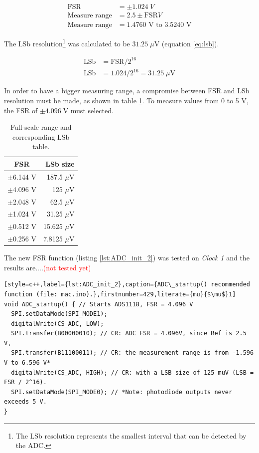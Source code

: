 \documentclass[a4paper,12pt]{article}
\begin{document}
\begin{align}
\text{FSR} &= \pm 1.024\; V\nonumber\\
\text{Measure range}&=2.5 \pm \text{FSR} V\nonumber\\
\text{Measure range}&= 1.4760 \text{ V to } 3.5240 \text{ V}
\label{eq:full_range_1}
\end{align}

The LSb resolution\footnote{The LSb resolution represents the smallest interval that can be detected by the ADC.} was calculated to be $31.25 \;\mu \mathrm{V}$ (equation \ref{eq:lsb}).

\begin{align}
\text{LSb} &= \text{FSR}/2^{16} \nonumber\\
\text{LSb} &= \text{1.024}/2^{16} = 31.25 \;\mu \mathrm{V}
\label{eq:lsb}
\end{align}

In order to have a bigger measuring range, a compromise between FSR and LSb resolution must be made, as shown in table \ref{table:FSR}. To measure values from 0 to 5 V, the FSR of $\pm 4.096 \;\mathrm{V}$ must selected. 

\begin{table}[h!]
\centering
\begin{tabular}{|c|r|}
\hline
\textbf{FSR} & \textbf{LSb size} \\ \hline
$\pm$6.144 V     & 187.5 $\mu$V          \\ \hline
$\pm$4.096 V     & 125 $\mu$V            \\ \hline
$\pm$2.048 V     & 62.5 $\mu$V           \\ \hline
$\pm$1.024 V     & 31.25 $\mu$V          \\ \hline
$\pm$0.512 V     & 15.625 $\mu$V         \\ \hline
$\pm$0.256 V     & 7.8125 $\mu$V         \\ \hline
\end{tabular}
\caption{Full-scale range and corresponding LSb table.}
\label{table:FSR}
\end{table}
The new FSR function (listing \ref{lst:ADC_init_2}) was tested on \textit{Clock 1} and the results are....\textcolor{red}{(not tested yet)}

\begin{lstlisting}[style=c++,label={lst:ADC_init_2},caption={ADC\_startup() recommended function (file: mac.ino).},firstnumber=429,literate={mu}{$\mu$}1]
void ADC_startup() { // Starts ADS1118, FSR = 4.096 V
  SPI.setDataMode(SPI_MODE1);
  digitalWrite(CS_ADC, LOW);
  SPI.transfer(B00000010); // CR: ADC FSR = 4.096V, since Ref is 2.5 V, 
  SPI.transfer(B11100011); // CR: the measurement range is from -1.596 V to 6.596 V*
  digitalWrite(CS_ADC, HIGH); // CR: with a LSB size of 125 muV (LSB = FSR / 2^16).
  SPI.setDataMode(SPI_MODE0); // *Note: photodiode outputs never exceeds 5 V.
}
\end{lstlisting}
\end{document}
